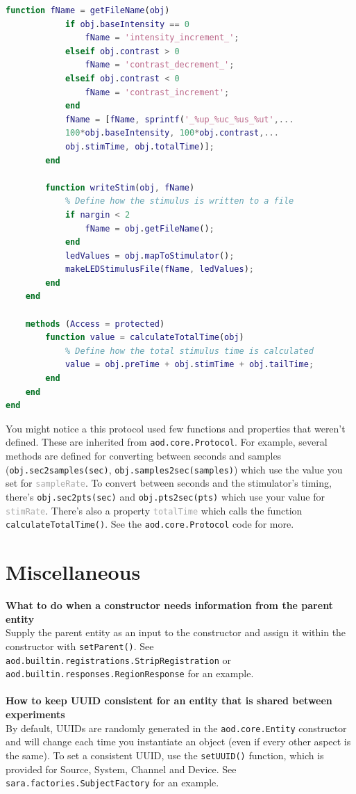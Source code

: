 \documentclass[10pt]{exam}
\newcommand\aodclass[1]{\textcolor{codeblue}{\texttt{#1}}}
\newcommand\aodprop[1]{\textcolor{darkgray}{\texttt{#1}}}
\newcommand\aodfcn[1]{\textcolor{darkteal}{\texttt{#1}}}
\begin{document}
\begin{lstlisting}[language=matlab]
		function fName = getFileName(obj)
			if obj.baseIntensity == 0
				fName = 'intensity_increment_';
			elseif obj.contrast > 0
				fName = 'contrast_decrement_';
			elseif obj.contrast < 0
				fName = 'contrast_increment';
			end
			fName = [fName, sprintf('_%up_%uc_%us_%ut',...
			100*obj.baseIntensity, 100*obj.contrast,... 
			obj.stimTime, obj.totalTime)];
		end
			
		function writeStim(obj, fName)
			% Define how the stimulus is written to a file
			if nargin < 2
				fName = obj.getFileName();
			end
			ledValues = obj.mapToStimulator();
			makeLEDStimulusFile(fName, ledValues);
		end
	end

	methods (Access = protected)
		function value = calculateTotalTime(obj)
			% Define how the total stimulus time is calculated
			value = obj.preTime + obj.stimTime + obj.tailTime;
		end
	end
end
		\end{lstlisting}
	\noindent 
	You might notice a this protocol used few functions and properties that weren't defined. These are inherited from \aodclass{aod.core.Protocol}. For example, several methods are defined for converting between seconds and samples (\aodfcn{obj.sec2samples(sec)}, \aodfcn{obj.samples2sec(samples)}) which use the value you set for \aodprop{sampleRate}. To convert between seconds and the stimulator's timing, there's \aodfcn{obj.sec2pts(sec)} and \aodfcn{obj.pts2sec(pts)} which use your value for \aodprop{stimRate}. There's also a property \aodprop{totalTime} which calls the function \aodfcn{calculateTotalTime()}. See the \aodclass{aod.core.Protocol} code for more.	

\section{Miscellaneous}
	\label{section:Misc}
	\noindent\textbf{What to do when a constructor needs information from the parent entity}\\
	Supply the parent entity as an input to the constructor and assign it within the constructor with \aodfcn{setParent()}. See \aodclass{aod.builtin.registrations.StripRegistration} or \aodclass{aod.builtin.responses.RegionResponse} for an example.
	\\$\quad$\\
	\noindent\textbf{How to keep UUID consistent for an entity that is shared between experiments}\\
	By default, UUIDs are randomly generated in the \aodclass{aod.core.Entity} constructor and will change each time you instantiate an object (even if every other aspect is the same). To set a consistent UUID, use the \aodfcn{setUUID()} function, which is provided for Source, System, Channel and Device. See \aodclass{sara.factories.SubjectFactory} for an example.
	
\end{document}
